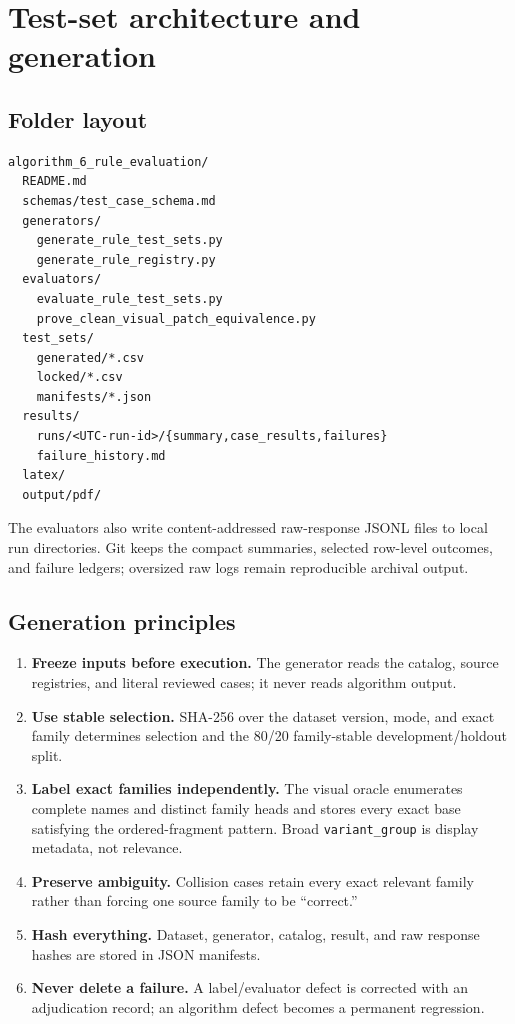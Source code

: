 \documentclass[10pt,oneside]{book}
\begin{document}
\chapter{Test-set architecture and generation}

\section{Folder layout}

\begin{lstlisting}
algorithm_6_rule_evaluation/
  README.md
  schemas/test_case_schema.md
  generators/
    generate_rule_test_sets.py
    generate_rule_registry.py
  evaluators/
    evaluate_rule_test_sets.py
    prove_clean_visual_patch_equivalence.py
  test_sets/
    generated/*.csv
    locked/*.csv
    manifests/*.json
  results/
    runs/<UTC-run-id>/{summary,case_results,failures}
    failure_history.md
  latex/
  output/pdf/
\end{lstlisting}

The evaluators also write content-addressed raw-response JSONL files to local
run directories. Git keeps the compact summaries, selected row-level outcomes,
and failure ledgers; oversized raw logs remain reproducible archival output.

\section{Generation principles}

\begin{enumerate}
\item \textbf{Freeze inputs before execution.} The generator reads the catalog,
source registries, and literal reviewed cases; it never reads algorithm output.
\item \textbf{Use stable selection.} SHA-256 over the dataset version, mode, and
exact family determines selection and the 80/20 family-stable development/holdout split.
\item \textbf{Label exact families independently.} The visual oracle enumerates
complete names and distinct family heads and stores every exact base satisfying
the ordered-fragment pattern. Broad \texttt{variant\_group} is display metadata,
not relevance.
\item \textbf{Preserve ambiguity.} Collision cases retain every exact relevant
family rather than forcing one source family to be ``correct.''
\item \textbf{Hash everything.} Dataset, generator, catalog, result, and raw
response hashes are stored in JSON manifests.
\item \textbf{Never delete a failure.} A label/evaluator defect is corrected
with an adjudication record; an algorithm defect becomes a permanent regression.
\end{enumerate}
\end{document}
